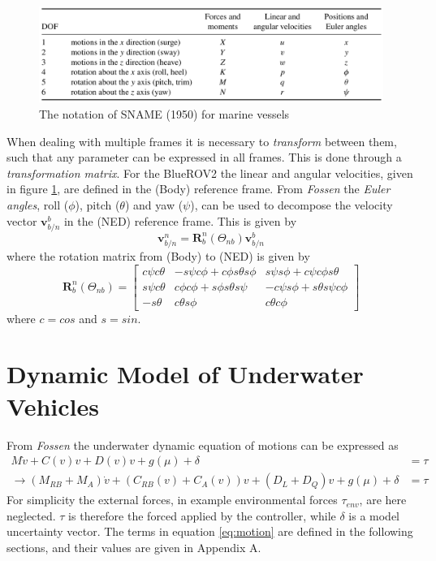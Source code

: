\begin{figure}[H]
    \centering
    \includegraphics[width=\textwidth]{images/chap4/SNAME.png}
    \caption{The notation of SNAME (1950) for marine vessels}
    \label{fig:sname}
\end{figure}
When dealing with multiple frames it is necessary to \textit{transform} between them, such that any parameter can be expressed in all frames. This is done through a \textit{transformation matrix}. For the BlueROV2 the linear and angular velocities, given in figure \ref{fig:sname}, are defined in the (Body) reference frame. From \textit{Fossen} \cite{Fossen} the \textit{Euler angles}, roll ($\phi$), pitch ($\theta$) and yaw ($\psi$), can be used to decompose the velocity vector $\textbf{v}_{b/n}^{b}$ in the (NED) reference frame. This is given by
\begin{equation}
    \mathbf{v}_{b/n}^{n} = \mathbf{R}_{b}^{n}(\Theta_{nb})\mathbf{v}_{b/n}^{b}
\end{equation}
where the rotation matrix from (Body) to (NED) is given by
\begin{equation}
    \mathbf{R}_{b}^{n}(\Theta_{nb}) = \begin{bmatrix}
    c\psi c\theta & -s\psi c \phi + c\phi s\theta s\phi & s\psi s\phi + c\psi c\phi s\theta \\ s\psi c\theta & c\phi c\phi + s\phi s\theta s\psi & -c\psi s\phi + s\theta s\psi c\phi \\ -s\theta & c\theta s\phi & c\theta c\phi 
    \end{bmatrix}
\end{equation}
where $c=cos$ and $s=sin$.
\section{Dynamic Model of Underwater Vehicles}
From \textit{Fossen} \cite{Fossen} the underwater dynamic equation of motions can be expressed as
\begin{align}
    M\Dot{v}+C(v)v+D(v)v+g(\mu)+\delta & = \tau \\
    \longrightarrow (M_{RB}+M_{A})\Dot{v}+(C_{RB}(v)+C_{A}(v))v+(D_{L}+D_{Q})v + g(\mu)+\delta & = \tau 
    \label{eq:motion}
\end{align}
For simplicity the external forces, in example environmental forces $\tau_{env}$, are here neglected. $\tau$ is therefore the forced applied by the controller, while $\delta$ is a model uncertainty vector. The terms in equation \ref{eq:motion} are defined in the following sections, and their values are given in Appendix A. 
